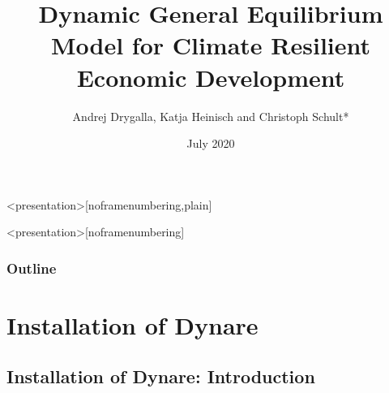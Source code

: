 \documentclass[11pt,aspectratio=169]{beamer}
\title[DGE--CRED]{Dynamic General Equilibrium Model for Climate Resilient Economic Development}
\author[Christoph Schult]{Andrej Drygalla, Katja Heinisch and Christoph Schult*} \date[July 2020]{July 2020}
\institute[IWH]{Halle Institute for Economic Research}
\begin{document}
{}

\begin{frame}<presentation>[noframenumbering,plain]
  \titlepage \\
	{\tiny} 
\end{frame}
\usebackgroundtemplate{
}
{
\begin{frame}<presentation>[noframenumbering]
	\frametitle{Outline}
		 \tableofcontents[hideallsubsections]
\end{frame}
}

\section{Installation of Dynare}

\subsection{Installation of Dynare: Introduction}
\end{document}
